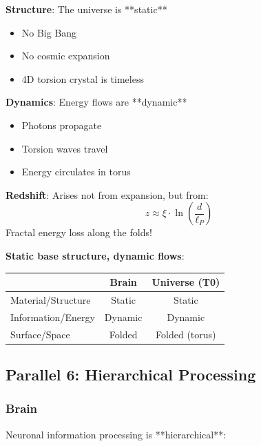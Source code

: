 	\textbf{Structure}: The universe is **static**
	\begin{itemize}
		\item No Big Bang
		\item No cosmic expansion
		\item 4D torsion crystal is timeless
	\end{itemize}
	
	\textbf{Dynamics}: Energy flows are **dynamic**
	\begin{itemize}
		\item Photons propagate
		\item Torsion waves travel
		\item Energy circulates in torus
	\end{itemize}
	
	\textbf{Redshift}: Arises not from expansion, but from:
	\begin{equation}
		z \approx \xi \cdot \ln\left(\frac{d}{\ell_P}\right)
	\end{equation}
	Fractal energy loss along the folds!
	
	\begin{keyresult}
		\textbf{Static base structure, dynamic flows}:
		
		\vspace{0.3cm}
		
		\begin{center}
			\begin{tabular}{lcc}
				\toprule
				& \textbf{Brain} & \textbf{Universe (T0)} \\
				\midrule
				Material/Structure & Static & Static \\
				Information/Energy & Dynamic & Dynamic \\
				Surface/Space & Folded & Folded (torus) \\
				\bottomrule
			\end{tabular}
		\end{center}
	\end{keyresult}
	
	\subsection{Parallel 6: Hierarchical Processing}
	
	\subsubsection{Brain}
	
	Neuronal information processing is **hierarchical**:
	
